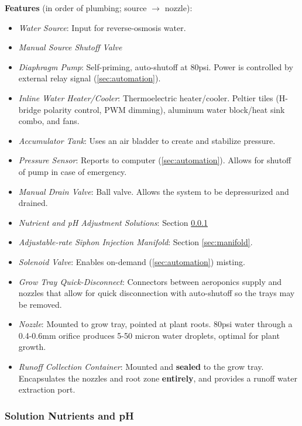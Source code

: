 \documentclass{report}
\begin{document}
\textbf{Features} (in order of plumbing; source $\to$ nozzle):
\begin{itemize}
    \item \textit{Water Source}: Input for reverse-osmosis water.
    \item \textit{Manual Source Shutoff Valve}
    \item \textit{Diaphragm Pump}: Self-priming, auto-shutoff at 80psi. Power is controlled by external relay signal (\ref{sec:automation}).
    \item \textit{Inline Water Heater/Cooler}: Thermoelectric heater/cooler. Peltier tiles (H-bridge polarity control, PWM dimming), aluminum water block/heat sink combo, and fans.
    \item \textit{Accumulator Tank}: Uses an air bladder to create and stabilize pressure.
    \item \textit{Pressure Sensor}: Reports to computer (\ref{sec:automation}). Allows for shutoff of pump in case of emergency.
    \item \textit{Manual Drain Valve}: Ball valve. Allows the system to be depressurized and drained.
    \item \textit{Nutrient and pH Adjustment Solutions}: Section \ref{sec:nutrientsph}
    \item \textit{Adjustable-rate Siphon Injection Manifold}: Section \ref{sec:manifold}.
    \item \textit{Solenoid Valve}: Enables on-demand (\ref{sec:automation}) misting.
    \item \textit{Grow Tray Quick-Disconnect}: Connectors between aeroponics supply and nozzles that allow for quick disconnection with auto-shutoff so the trays may be removed.
    \item \textit{Nozzle}: Mounted to grow tray, pointed at plant roots. 80psi water through a 0.4-0.6mm orifice produces 5-50 micron water droplets, optimal for plant growth. %
    \item \textit{Runoff Collection Container}: Mounted and \textbf{sealed} to the grow tray. Encapsulates the nozzles and root zone \textbf{entirely}, and provides a runoff water extraction port.
\end{itemize}

\vspace{.5cm}

\subsubsection{Solution Nutrients and pH}
\label{sec:nutrientsph}
\end{document}
